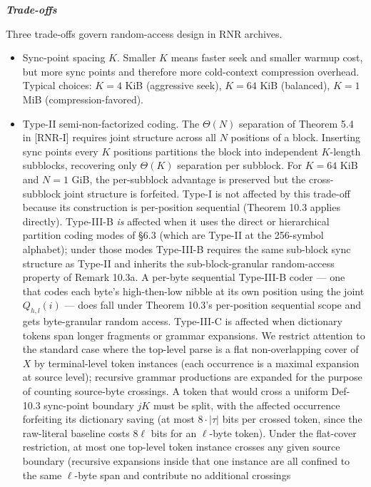 \documentclass[
]{article}
\begin{document}
\emph{\textbf{Trade-offs}}

Three trade-offs govern random-access design in RNR archives.

\begin{itemize}
\item
  Sync-point spacing $K$. Smaller $K$ means faster seek and smaller
  warmup cost, but more sync points and therefore more cold-context
  compression overhead. Typical choices: $K = 4$ KiB (aggressive
  seek), $K = 64$ KiB (balanced), $K = 1$ MiB (compression-favored).
\item
  Type-II semi-non-factorized coding. The $\Theta(N)$ separation of Theorem 5.4 in [RNR-I]
  requires joint structure across all $N$ positions of a
  block. Inserting sync points every $K$ positions partitions the
  block into independent $K$-length subblocks, recovering only
  $\Theta(K)$ separation per subblock. For $K = 64$ KiB and $N = 1$
  GiB, the per-subblock advantage is preserved but the cross-subblock
  joint structure is forfeited. Type-I is not affected by this
  trade-off because its construction is per-position sequential
  (Theorem 10.3 applies directly). Type-III-B \emph{is} affected
  when it uses the direct or hierarchical partition coding modes of
  §6.3 (which are Type-II at the 256-symbol alphabet); under those
  modes Type-III-B requires the same sub-block sync structure as
  Type-II and inherits the sub-block-granular random-access
  property of Remark 10.3a. A per-byte sequential Type-III-B coder
  --- one that codes each byte's high-then-low nibble at its own
  position using the joint $Q_{h,l}(i)$ --- does fall under Theorem
  10.3's per-position sequential scope and gets byte-granular
  random access. Type-III-C
  is affected when dictionary tokens span longer fragments or
  grammar expansions. We restrict attention to the standard case
  where the top-level parse is a flat non-overlapping cover of $X$
  by terminal-level token instances (each occurrence is a maximal
  expansion at source level); recursive grammar productions are
  expanded for the purpose of counting source-byte crossings. A
  token that would cross a uniform Def-10.3 sync-point boundary
  $jK$ must be split, with the affected occurrence forfeiting its
  dictionary saving (at most $8 \cdot |\tau|$ bits per crossed
  token, since the raw-literal baseline costs $8\ell$ bits for an
  $\ell$-byte token). Under the flat-cover restriction, at most one
  top-level token instance crosses any given source boundary
  (recursive expansions inside that one instance are all confined to
  the same $\ell$-byte span and contribute no additional crossings

\end{itemize}
\end{document}
